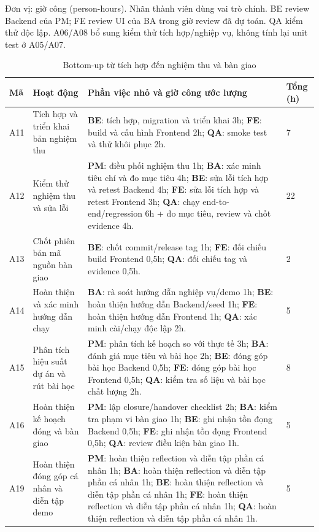 \documentclass{article}
\begin{document}
\begin{landscape}
\noindent Đơn vị: giờ công (person-hours). Nhãn thành viên dùng vai trò chính. BE review Backend của PM; FE review UI của BA trong giờ review đã dự toán. QA kiểm thử độc lập. A06/A08 bổ sung kiểm thử tích hợp/nghiệp vụ, không tính lại unit test ở A05/A07.
\newpage
\begin{table}[H]
\centering
\caption{Bottom-up từ tích hợp đến nghiệm thu và bàn giao}
\small
\renewcommand{\arraystretch}{1.2}
\begin{tabularx}{\linewidth}{|p{1.1cm}|p{5.3cm}|>{\raggedright\arraybackslash}X|p{1.25cm}|}
\hline
\textbf{Mã} & \textbf{Hoạt động} & \textbf{Phần việc nhỏ và giờ công ước lượng} & \textbf{Tổng (h)} \\ \hline
A11 & Tích hợp và triển khai bản nghiệm thu & \textbf{BE}: tích hợp, migration và triển khai 3h; \textbf{FE}: build và cấu hình Frontend 2h; \textbf{QA}: smoke test và thử khôi phục 2h. & 7 \\ \hline
A12 & Kiểm thử nghiệm thu và sửa lỗi & \textbf{PM}: điều phối nghiệm thu 1h; \textbf{BA}: xác minh tiêu chí và đo mục tiêu 4h; \textbf{BE}: sửa lỗi tích hợp và retest Backend 4h; \textbf{FE}: sửa lỗi tích hợp và retest Frontend 3h; \textbf{QA}: chạy end-to-end/regression 6h + đo mục tiêu, review và chốt evidence 4h. & 22 \\ \hline
A13 & Chốt phiên bản mã nguồn bàn giao & \textbf{BE}: chốt commit/release tag 1h; \textbf{FE}: đối chiếu build Frontend 0,5h; \textbf{QA}: đối chiếu tag và evidence 0,5h. & 2 \\ \hline
A14 & Hoàn thiện và xác minh hướng dẫn chạy & \textbf{BA}: rà soát hướng dẫn nghiệp vụ/demo 1h; \textbf{BE}: hoàn thiện hướng dẫn Backend/seed 1h; \textbf{FE}: hoàn thiện hướng dẫn Frontend 1h; \textbf{QA}: xác minh cài/chạy độc lập 2h. & 5 \\ \hline
A15 & Phân tích hiệu suất dự án và rút bài học & \textbf{PM}: phân tích kế hoạch so với thực tế 3h; \textbf{BA}: đánh giá mục tiêu và bài học 2h; \textbf{BE}: đóng góp bài học Backend 0,5h; \textbf{FE}: đóng góp bài học Frontend 0,5h; \textbf{QA}: kiểm tra số liệu và bài học chất lượng 2h. & 8 \\ \hline
A16 & Hoàn thiện kế hoạch đóng và bàn giao & \textbf{PM}: lập closure/handover checklist 2h; \textbf{BA}: kiểm tra phạm vi bàn giao 1h; \textbf{BE}: ghi nhận tồn đọng Backend 0,5h; \textbf{FE}: ghi nhận tồn đọng Frontend 0,5h; \textbf{QA}: review điều kiện bàn giao 1h. & 5 \\ \hline
A19 & Hoàn thiện đóng góp cá nhân và diễn tập demo & \textbf{PM}: hoàn thiện reflection và diễn tập phần cá nhân 1h; \textbf{BA}: hoàn thiện reflection và diễn tập phần cá nhân 1h; \textbf{BE}: hoàn thiện reflection và diễn tập phần cá nhân 1h; \textbf{FE}: hoàn thiện reflection và diễn tập phần cá nhân 1h; \textbf{QA}: hoàn thiện reflection và diễn tập phần cá nhân 1h. & 5 \\ \hline

\end{tabularx}
\end{table}
\end{landscape}
\end{document}

